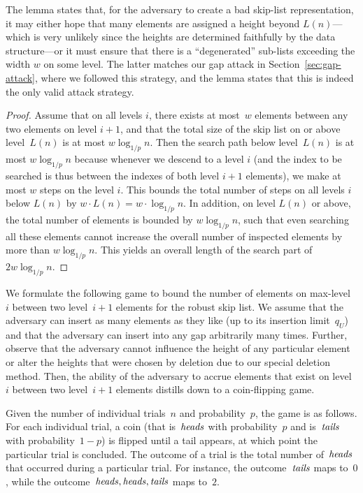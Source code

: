 The lemma states that, for the adversary to create a bad skip-list representation, it may either hope that many elements are assigned a height beyond $L(n)$---which is very unlikely since the heights are determined faithfully by the data structure---or it must ensure that there is a ``degenerated'' sub-lists exceeding the width $w$ on some level. The latter matches our gap attack in Section~\ref{sec:gap-attack}, where we followed this strategy, and the lemma states that this is indeed the only valid attack strategy.

\begin{proof}
Assume that on all levels $i$, there exists at most~$w$ elements between any two elements on level $i+1$, and 
that the total size of the skip list on or above level~$L(n)$ is at most $ w \log_{1/p} n$. Then the search path below level~$L(n)$ is at most $w \log_{1/p} n$ because whenever we descend to a level $i$ (and the index to be searched is thus between the indexes of both level $i+1$ elements), we make at most $w$ steps on the level $i$. This bounds the total number of steps on all levels $i$ below $L(n)$ by $w\cdot L(n)=w\cdot \log_{1/p} n$.  In addition, on level $L(n)$ or above, the total number of elements is bounded by $w \log_{1/p} n$, such that even searching all these elements cannot increase the overall number of inspected elements by more than $w \log_{1/p} n$. This yields an overall length of the search part of $2w \log_{1/p} n$.
\end{proof}

We formulate the following game to bound the number of elements on max-level~$i$ between two level~$i+1$ elements for the robust skip list. We assume that the adversary can insert as many elements as they like (up to its insertion limit~$q_U$) and that the adversary can insert into any gap arbitrarily many times. Further, observe that the adversary cannot influence the height of any particular element or alter the heights that were chosen by deletion due to our special deletion method. Then, the ability of the adversary to accrue elements that exist on level~$i$ between two level~$i+1$ elements distills down to a coin-flipping game. 

Given the number of individual trials~$n$ and probability~$p$, the game is as follows. For each individual trial, a coin (that is~$\mathit{heads}$ with probability~$p$ and is~$\mathit{tails}$ with probability~$1-p$) is flipped until a tail appears, at which point the particular trial is concluded. The outcome of a trial is the total number of~$\mathit{heads}$ that occurred during a particular trial. For instance, the outcome~$\mathit{tails}$ maps to~$0$, while the outcome~$\mathit{heads},\mathit{heads},\mathit{tails}$ maps to~$2$. 

